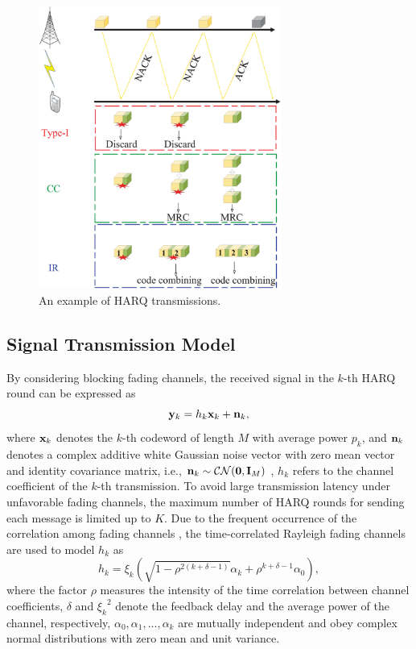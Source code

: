 \documentclass[conference]{IEEEtran}
\begin{document}
\begin{figure}[htbp]
    \centering
    \includegraphics[width=8cm]{HARQSchme4.eps}
    \caption{An example of HARQ transmissions.}
    \label{FIG1} %
\end{figure}

\subsection{Signal Transmission Model}
By considering blocking fading channels, the received signal in the  $k$-th HARQ round can be expressed as
\begin{equation}\label{eqn:receive signal}
{{\bf{y}}_k} = {h_k}{{\bf{x}}_k} + {{\bf{n}}_k},
\end{equation}
where ${{\bf{x}}_k}$ denotes the $k$-th codeword of length $M$ with average power $p_k$, and ${{\bf{n}}_k}$ denotes a complex additive white Gaussian noise vector with zero mean vector and identity covariance matrix, i.e., ${{\bf{n}}_k} \sim {\cal CN}({\bf 0},{{\bf{I}}_{ M}})$ %
,
${h_k}$ refers to the channel coefficient of the $k$-th transmission. To avoid large transmission latency under unfavorable fading channels, the maximum number of HARQ rounds for sending each message is limited up to $K$. Due to the frequent occurrence of the correlation among fading channels \cite{5692978}, the time-correlated Rayleigh fading channels are used to model $h_k$ as
\begin{equation}\label{eqn:channel model}
{h_k} = {\xi    _k}\left(\sqrt {1 - {\rho ^{2(k + \delta  - 1)}}} {\alpha _k} + {\rho ^{k + \delta  - 1}}{\alpha _0}\right),
\end{equation}
where the factor $\rho$ measures the intensity of the time correlation between channel coefficients, $\delta$ and $ {\xi _k}^2$ denote the feedback delay and the average power of the channel, respectively, ${\alpha _0},{\alpha _1},...,{\alpha _k}$ are mutually independent and obey complex normal distributions with zero mean and unit variance.%
\end{document}
